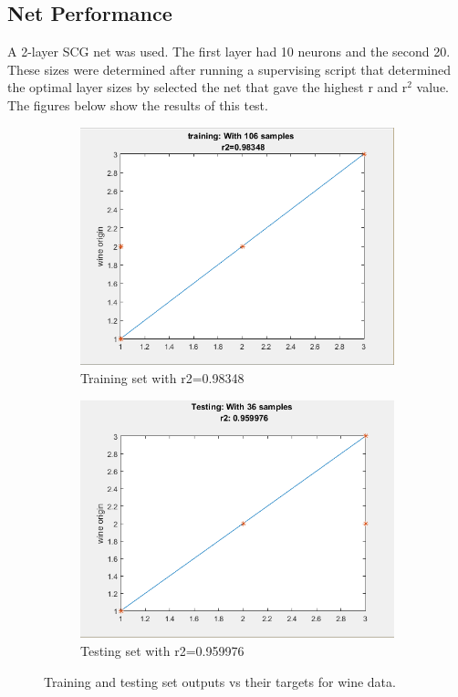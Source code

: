 \documentclass[10pt]{article}
\begin{document}
\subsection{Net Performance}
A 2-layer SCG net was used. The first layer had 10 neurons and the second 20. These sizes were determined after running a supervising script that determined the optimal layer sizes by selected the net that gave the highest r and r$^{2}$ value. The figures below show the results of this test.
\begin{center}
\begin{figure}[h]
  \begin{subfigure}[b]{0.49\textwidth}
    \includegraphics[width=\textwidth]{wine_trainr}
    \caption{Training set with r2=0.98348 }
    \label{fig:1}
  \end{subfigure}
  \begin{subfigure}[b]{0.49\textwidth}
    \includegraphics[width=\textwidth]{wine_testr}
    \caption{Testing set with r2=0.959976}
    \label{fig:2}
  \end{subfigure}
  \caption{Training and testing set outputs vs their targets for wine data.}
\end{figure}
\end{center}
\end{document}
